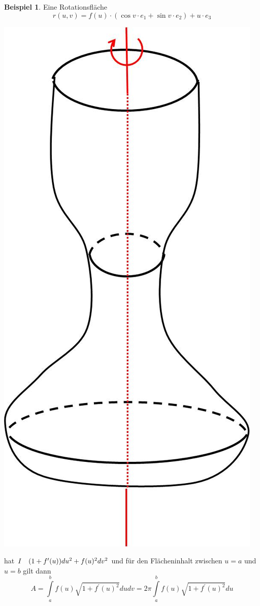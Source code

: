 \documentclass[a4paper,11pt,notitlepage]{report}
\theoremstyle{definition}
\newtheorem{example}{Beispiel}[chapter]
\newcommand{\RM}[1]{\MakeUppercase{\romannumeral #1{}}}
\begin{document}
\begin{example}
	Eine Rotationsfläche
	$$r(u,v) = f(u) \cdot (\cos v \cdot e_1 + \sin v \cdot e_2) + u \cdot e_3$$
		\begin{center}
	\includegraphics[scale=0.4]{images/2012_01_24_Bild4.jpg}
\end{center}
	hat $\RM{1} \quad (1 + f^\prime(u)) du^2 + f(u)^2 dv^2$
	und für den Flächeninhalt zwischen $u=a$ und $u=b$ gilt dann
	$$A = \int\limits_{a}^b{f(u) \sqrt{1+f^\prime(u)^2} dudv} = 2 \pi \int\limits_a^b{f(u) \sqrt{1 + f^\prime(u)^2} du}$$
\end{example}
\end{document}
